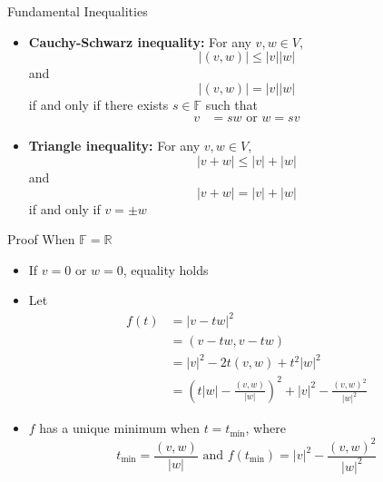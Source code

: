 \documentclass[usenames,dvipsnames,10pt]{beamer}
\newcommand\F{\mathbb{F}}
\newcommand{\R}{\mathbb{R}}
\begin{document}
\begin{frame}
  {Fundamental Inequalities}

  \begin{itemize}
  \item {\bf Cauchy-Schwarz inequality:} For any $v, w\in V$,
    \[ |(v,w)| \le |v||w| \]
    and
    \[ |(v,w)| = |v||w| \]
    if and only if there exists $s \in \F$ such that
    \begin{align*}
      v &= sw\text{ or }w = sv
    \end{align*}
  \item {\bf Triangle inequality:} For any $v, w\in V$,
    \[ |v+w| \le |v|+|w| \]
    and
    \[ |v+w| = |v|+|w| \]
    if and only if $v = \pm w$
  \end{itemize}
\end{frame}

\begin{frame}
  {Proof When $\F=\R$}
  \begin{itemize}
  \item If $v = 0$ or $w = 0$, equality holds
  \item Let
    \begin{align*}
      f(t) &= |v-tw|^2\\
           &= (v-tw,v-tw)\\
           &= |v|^2 - 2t(v,w) + t^2|w|^2\\
           &= \left(t|w|-\frac{(v,w)}{|w|}\right)^2 + |v|^2-\frac{(v,w)^2}{|w|^2}
    \end{align*}
  \item $f$ has a unique minimum when $t = t_{\min}$, where
    \[
      t_{\min} = \frac{(v,w)}{|w|}\text{ and }f(t_{\min}) = |v|^2-\frac{(v,w)^2}{|w|^2}
    \]
  \end{itemize}
\end{frame}
\end{document}
